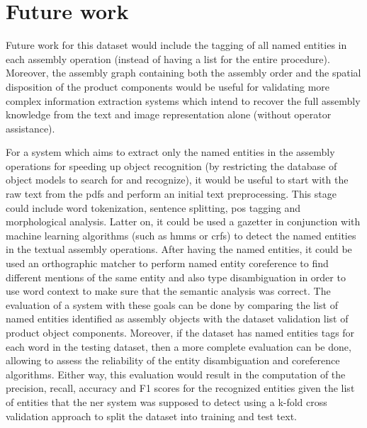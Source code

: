 \section{Future work}\label{sec:future-work}

Future work for this dataset would include the tagging of all named entities in each assembly operation (instead of having a list for the entire procedure). Moreover, the assembly graph containing both the assembly order and the spatial disposition of the product components would be useful for validating more complex information extraction systems which intend to recover the full assembly knowledge from the text and image representation alone (without operator assistance).

For a system which aims to extract only the named entities in the assembly operations for speeding up object recognition (by restricting the database of object models to search for and recognize), it would be useful to start with the raw text from the \glspl{pdf} and perform an initial text preprocessing. This stage could include word tokenization, sentence splitting, \gls{pos} tagging and morphological analysis. Latter on, it could be used a gazetter in conjunction with machine learning algorithms (such as \glspl{hmm} or \glspl{crf}) to detect the named entities in the textual assembly operations. After having the named entities, it could be used an orthographic matcher to perform named entity coreference to find different mentions of the same entity and also type disambiguation in order to use word context to make sure that the semantic analysis was correct. The evaluation of a system with these goals can be done by comparing the list of named entities identified as assembly objects with the dataset validation list of product object components. Moreover, if the dataset has named entities tags for each word in the testing dataset, then a more complete evaluation can be done, allowing to assess the reliability of the entity disambiguation and coreference algorithms. Either way, this evaluation would result in the computation of the precision, recall, accuracy and F1 scores for the recognized entities given the list of entities that the \gls{ner} system was supposed to detect using a k-fold cross validation approach to split the dataset into training and test text.
